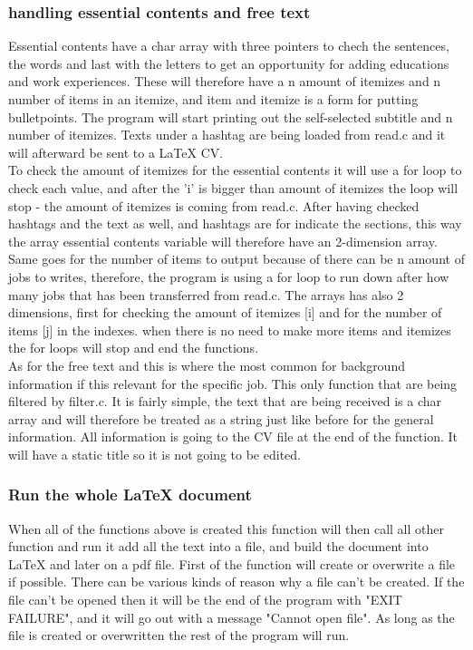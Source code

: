 \subsubsection{handling essential contents and free text}
Essential contents have a char array with three pointers to chech the sentences,
the words and last with the letters to get an opportunity for adding educations and work experiences.
These will therefore have a n amount of itemizes and n number of items in an itemize, 
and item and itemize is a form for putting bulletpoints.
The program will start printing out the self-selected subtitle and n number of itemizes.
Texts under a hashtag are being loaded from read.c and it will afterward be sent to a LaTeX CV.\\
 
To check the amount of itemizes for the essential contents it will use a for loop to check each value,
and after the 'i' is bigger than amount of itemizes the loop will stop - the amount of itemizes is coming from read.c.
After having checked hashtags and the text as well, and hashtags are for indicate the sections,
this way the array essential contents variable will therefore have an 2-dimension array.
Same goes for the number of items to output because of there can be n amount of jobs to writes, 
therefore, the program is using a for loop to run down after how many jobs that has been transferred from read.c.
The arrays has also 2 dimensions, first for checking the amount of itemizes [i] and for the number of items [j] in the indexes.
when there is no need to make more items and itemizes the for loops will stop and end the functions. \\

As for the free text and this is where the most common for background information if this relevant for the specific job.
This only function that are being filtered by filter.c. It is fairly simple, 
the text that are being received is a char array and will therefore be treated as a string 
just like before for the general information. All information is going to the CV file at the end of the function.
It will have a static title so it is not going to be edited.

\subsubsection{Run the whole LaTeX document}
When all of the functions above is created this function will then call all other function and run it add all the text into a file,
and build the document into LaTeX and later on a pdf file.
First of the function will create or overwrite a file if possible. There can be various kinds of reason why a file can't be created.
If the file can't be opened then it will be the end of the program with "EXIT FAILURE", 
and it will go out with a message "Cannot open file".
As long as the file is created or overwritten the rest of the program will run.\\


